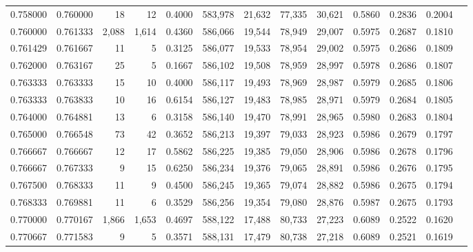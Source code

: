 \begin{tabular}{rrrrrrrrrrrrr}
0.758000 & 0.760000 &     18 &    12 &                                     0.4000 & 583,978 &  21,632 &  77,335 &  30,621 & 0.5860 & 0.2836 & 0.2004 \\
0.760000 & 0.761333 &  2,088 & 1,614 &                                     0.4360 & 586,066 &  19,544 &  78,949 &  29,007 & 0.5975 & 0.2687 & 0.1810 \\
0.761429 & 0.761667 &     11 &     5 &                                     0.3125 & 586,077 &  19,533 &  78,954 &  29,002 & 0.5975 & 0.2686 & 0.1809 \\
0.762000 & 0.763167 &     25 &     5 &                                     0.1667 & 586,102 &  19,508 &  78,959 &  28,997 & 0.5978 & 0.2686 & 0.1807 \\
0.763333 & 0.763333 &     15 &    10 &                                     0.4000 & 586,117 &  19,493 &  78,969 &  28,987 & 0.5979 & 0.2685 & 0.1806 \\
0.763333 & 0.763833 &     10 &    16 &                                     0.6154 & 586,127 &  19,483 &  78,985 &  28,971 & 0.5979 & 0.2684 & 0.1805 \\
0.764000 & 0.764881 &     13 &     6 &                                     0.3158 & 586,140 &  19,470 &  78,991 &  28,965 & 0.5980 & 0.2683 & 0.1804 \\
0.765000 & 0.766548 &     73 &    42 &                                     0.3652 & 586,213 &  19,397 &  79,033 &  28,923 & 0.5986 & 0.2679 & 0.1797 \\
0.766667 & 0.766667 &     12 &    17 &                                     0.5862 & 586,225 &  19,385 &  79,050 &  28,906 & 0.5986 & 0.2678 & 0.1796 \\
0.766667 & 0.767333 &      9 &    15 &                                     0.6250 & 586,234 &  19,376 &  79,065 &  28,891 & 0.5986 & 0.2676 & 0.1795 \\
0.767500 & 0.768333 &     11 &     9 &                                     0.4500 & 586,245 &  19,365 &  79,074 &  28,882 & 0.5986 & 0.2675 & 0.1794 \\
0.768333 & 0.769881 &     11 &     6 &                                     0.3529 & 586,256 &  19,354 &  79,080 &  28,876 & 0.5987 & 0.2675 & 0.1793 \\
0.770000 & 0.770167 &  1,866 & 1,653 &                                     0.4697 & 588,122 &  17,488 &  80,733 &  27,223 & 0.6089 & 0.2522 & 0.1620 \\
0.770667 & 0.771583 &      9 &     5 &                                     0.3571 & 588,131 &  17,479 &  80,738 &  27,218 & 0.6089 & 0.2521 & 0.1619 \\

\end{tabular}
